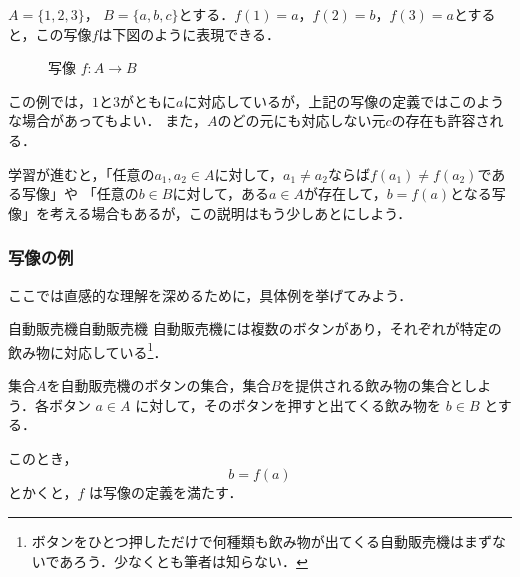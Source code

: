 \documentclass[a4paper,11pt]{ltjsarticle}
\begin{document}
$A=\{ 1,2 ,3 \}$， $B=\{ a, b,c \}$とする．$f(1) = a$，$f(2) = b$，$f(3) = a$とすると，この写像$f$は下図のように表現できる．
\begin{figure}[h]
  \centering
  \caption{写像 $f \colon A \to B$}
\end{figure}

この例では，$1$と$3$がともに$a$に対応しているが，上記の写像の定義ではこのような場合があってもよい．
また，$A$のどの元にも対応しない元$c$の存在も許容される．

学習が進むと，「任意の$ a_1 , a_2 \in A$に対して，$ a_1 \ne a_2$ならば$f(a_1) \ne f(a_2)$である写像」や
「任意の$ b \in B$に対して，ある$a \in A$が存在して，$b=f(a)$となる写像」を考える場合もあるが，この説明はもう少しあとにしよう．

\subsubsection{写像の例}

ここでは直感的な理解を深めるために，具体例を挙げてみよう．

\begin{example}{自動販売機}{自動販売機}
  自動販売機には複数のボタンがあり，それぞれが特定の飲み物に対応している\footnote{ボタンをひとつ押しただけで何種類も飲み物が出てくる自動販売機はまずないであろう．少なくとも筆者は知らない．}．

  集合$A$を自動販売機のボタンの集合，集合$B$を提供される飲み物の集合としよう．各ボタン $a \in A$ に対して，そのボタンを押すと出てくる飲み物を $b \in B$ とする．

  このとき，
  \[
    b=f(a)
  \]
  とかくと，$f$ は写像の定義を満たす．
\end{example}
\end{document}
